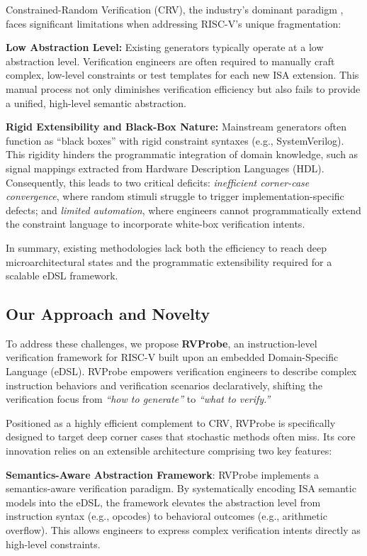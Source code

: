 \documentclass[sigconf]{acmart}
\begin{document}
Constrained-Random Verification (CRV), the industry's dominant paradigm \cite{19}, faces significant limitations when addressing RISC-V's unique fragmentation:

\textbf{Low Abstraction Level:} Existing generators typically operate at a low abstraction level. Verification engineers are often required to manually craft complex, low-level constraints or test templates for each new ISA extension. This manual process not only diminishes verification efficiency but also fails to provide a unified, high-level semantic abstraction.

\textbf{Rigid Extensibility and Black-Box Nature:} Mainstream generators often function as ``black boxes'' with rigid constraint syntaxes (e.g., SystemVerilog). This rigidity hinders the programmatic integration of domain knowledge, such as signal mappings extracted from Hardware Description Languages (HDL). Consequently, this leads to two critical deficits: \textit{inefficient corner-case convergence}, where random stimuli struggle to trigger implementation-specific defects; and \textit{limited automation}, where engineers cannot programmatically extend the constraint language to incorporate white-box verification intents.

In summary, existing methodologies lack both the efficiency to reach deep microarchitectural states and the programmatic extensibility required for a scalable eDSL framework.

\subsection{Our Approach and Novelty}

To address these challenges, we propose \textbf{RVProbe}, an instruction-level verification framework for RISC-V built upon an embedded Domain-Specific Language (eDSL). RVProbe empowers verification engineers to describe complex instruction behaviors and verification scenarios declaratively, shifting the verification focus from \textit{``how to generate''} to \textit{``what to verify.''}

Positioned as a highly efficient complement to CRV, RVProbe is specifically designed to target deep corner cases that stochastic methods often miss. Its core innovation relies on an extensible architecture comprising two key features:

\textbf{Semantics-Aware Abstraction Framework}: RVProbe implements a semantics-aware verification paradigm. By systematically encoding ISA semantic models into the eDSL, the framework elevates the abstraction level from instruction syntax (e.g., opcodes) to behavioral outcomes (e.g., arithmetic overflow). This allows engineers to express complex verification intents directly as high-level constraints.
\end{document}

